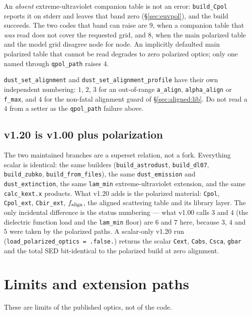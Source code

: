 \documentclass{my_memo}
\newcommand{\code}[1]{\texttt{#1}}
\newcommand{\falign}{\ensuremath{f_{\rm align}}}
\begin{document}
An \emph{absent} extreme-ultraviolet companion table is not an error:
\code{build\_Cpol} reports it on stderr and leaves that band zero
(\S\ref{sec:euvpol}), and the build succeeds. The two codes that band can raise
are $9$, when a companion table that \emph{was} read does not cover the
requested grid, and $8$, when the main polarized table and the model grid
disagree node for node. An implicitly defaulted main polarized table that
cannot be read degrades to zero polarized optics; only one named through
\code{qpol\_path} raises $4$.

\code{dust\_set\_alignment} and \code{dust\_set\_alignment\_profile} have their own
independent numbering: $1$, $2$, $3$ for an out-of-range \code{a\_align},
\code{alpha\_align} or \code{f\_max}, and $4$ for the non-fatal alignment guard of
\S\ref{sec:aligned:lib}. Do not read a $4$ from a setter as the \code{qpol\_path}
failure above.

\subsection{v1.20 is v1.00 plus polarization}

The two maintained branches are a superset relation, not a fork. Everything scalar
is identical: the same builders (\code{build\_astrodust}, \code{build\_dl07},
\code{build\_zubko}, \code{build\_from\_files}), the same \code{dust\_emission} and
\code{dust\_extinction}, the same \code{lam\_min} extreme-ultraviolet extension,
and the same \code{calc\_kext.x} products. What v1.20 adds is the polarized
material: \code{Cpol}, \code{Cpol\_ext}, \code{Cbir\_ext}, \falign, the aligned
scattering table and its library layer. The only incidental difference is the
status numbering --- what v1.00 calls $3$ and $4$ (the dielectric function load
and the \code{lam\_min} floor) are $6$ and $7$ here, because $3$, $4$ and $5$ were
taken by the polarized paths. A scalar-only v1.20 run
(\code{load\_polarized\_optics = .false.}) returns the scalar \code{Cext},
\code{Cabs}, \code{Csca}, \code{gbar} and the total SED bit-identical to the
polarized build at zero alignment.

\section{Limits and extension paths}

These are limits of the published optics, not of the code.
\end{document}
